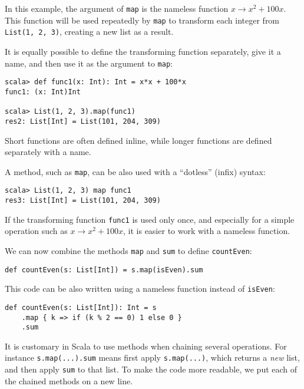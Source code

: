 In this example, the argument of \lstinline!map! is the nameless
function $x\rightarrow x^{2}+100x$. This function will be used repeatedly
by \texttt{}\lstinline!map! to transform each integer from \lstinline!List(1, 2, 3)!,
creating a new list as a result.

It is equally possible to define the transforming function separately,
give it a name, and then use it as the argument to \lstinline!map!:
\begin{lstlisting}
scala> def func1(x: Int): Int = x*x + 100*x
func1: (x: Int)Int 

scala> List(1, 2, 3).map(func1)
res2: List[Int] = List(101, 204, 309)
\end{lstlisting}
Short functions are often defined inline, while longer functions are
defined separately with a name.

A method, such as \lstinline!map!, can be also used with a \textsf{``}dotless\textsf{''}
(infix) syntax:
\begin{lstlisting}
scala> List(1, 2, 3) map func1
res3: List[Int] = List(101, 204, 309)
\end{lstlisting}

If the transforming function \lstinline!func1! is used only once,
and especially for a simple operation such as $x\rightarrow x^{2}+100x$,
it is easier to work with a nameless function.

We can now combine the methods \texttt{}\lstinline!map! and \texttt{}\lstinline!sum!
to define \lstinline!countEven!:

\begin{lstlisting}
def countEven(s: List[Int]) = s.map(isEven).sum
\end{lstlisting}

This code can be also written using a nameless function instead of
\lstinline!isEven!:

\begin{lstlisting}
def countEven(s: List[Int]): Int = s
    .map { k => if (k % 2 == 0) 1 else 0 }
    .sum
\end{lstlisting}

It is customary in Scala to use methods when chaining several operations.
For instance \lstinline!s.map(...).sum! means first apply \lstinline!s.map(...)!,
which returns a \emph{new} list, and then apply \texttt{}\lstinline!sum!
to that list. To make the code more readable, we put each of the chained
methods on a new line. 

